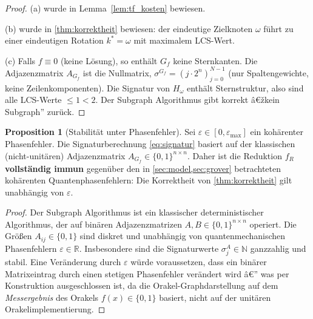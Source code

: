 ﻿\documentclass[11pt,a4paper]{article}
\theoremstyle{definition}
\newtheorem{proposition}[theorem]{Proposition}
\begin{document}
\begin{proof}
  (a) wurde in Lemma~\ref{lem:tf_kosten} bewiesen.

  (b) wurde in \cref{thm:korrektheit} bewiesen: der eindeutige Zielknoten $\omega$
  führt zu einer eindeutigen Rotation $k^* = \omega$ mit maximalem LCS-Wert.

  (c) Falls $f \equiv 0$ (keine Lösung), so enthält $G_f$ keine Sternkanten.
  Die Adjazenzmatrix $A_{G_f}$ ist die Nullmatrix, $\sigma^{G_f} = (j \cdot 2^n)_{j=0}^{N-1}$
  (nur Spaltengewichte, keine Zeilenkomponenten).  Die Signatur von $H_\omega$
  enthält Sternstruktur, also sind alle LCS-Werte $\leq 1 < 2$.
  Der Subgraph Algorithmus gibt korrekt â€žkein Subgraph'' zurück.
\end{proof}

\begin{proposition}[Stabilität unter Phasenfehler]
\label{prop:phasenstabilitaet}
  Sei $\varepsilon \in [0, \varepsilon_{\max}]$ ein kohärenter Phasenfehler.
  Die Signaturberechnung \eqref{eq:signatur} basiert auf der klassischen
  (nicht-unitären) Adjazenzmatrix $A_{G_f} \in \{0,1\}^{n \times n}$.
  Daher ist die Reduktion $f_R$ \textbf{vollständig immun} gegenüber den
  in \cref{sec:model,sec:grover} betrachteten kohärenten Quantenphasenfehlern:
  Die Korrektheit von \cref{thm:korrektheit} gilt unabhängig von $\varepsilon$.
\end{proposition}

\begin{proof}
  Der Subgraph Algorithmus \cite{Epp2026} ist ein klassischer deterministischer
  Algorithmus, der auf binären Adjazenzmatrizen $A, B \in \{0,1\}^{n\times n}$
  operiert.  Die Größen $A_{ij} \in \{0,1\}$ sind diskret und unabhängig von
  quantenmechanischen Phasenfehlern $\varepsilon \in \mathbb{R}$.
  Insbesondere sind die Signaturwerte $\sigma_j^A \in \mathbb{N}$ ganzzahlig
  und stabil.  Eine Veränderung durch $\varepsilon$ würde voraussetzen, dass
  ein binärer Matrixeintrag durch einen stetigen Phasenfehler verändert wird â€”
  was per Konstruktion ausgeschlossen ist, da die Orakel-Graphdarstellung
  auf dem \emph{Messergebnis} des Orakels $f(x) \in \{0,1\}$ basiert, nicht
  auf der unitären Orakelimplementierung.
\end{proof}

\end{document}
